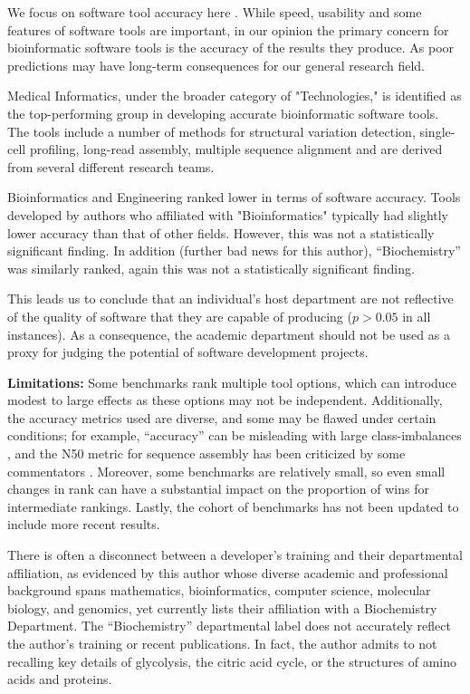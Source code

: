 \documentclass[fleqn,10pt,doc,onecolumn]{SelfArx}%
\begin{document}
We focus on software tool accuracy here \cite{weber2019essential}. While speed, usability and
some features of software tools are important, in our opinion the
primary concern for bioinformatic software tools is the accuracy of
the results they produce. As poor predictions may have long-term consequences for
our general research field. 

Medical Informatics, under the broader category of "Technologies," is
identified as the top-performing group in developing accurate
bioinformatic software tools. The tools include a number of methods
for structural variation detection, single-cell profiling, long-read
assembly, multiple sequence alignment and are derived from several
different research teams. 

Bioinformatics and Engineering ranked lower in terms of software
accuracy. Tools developed by authors who affiliated with
"Bioinformatics" typically had slightly lower accuracy than that of
other fields. However, this was not a statistically significant
finding. In addition (further bad news for this author),
``Biochemistry'' was similarly ranked, again this was not a
statistically significant finding.

This leads us to conclude that an individual's host department are not
reflective of the quality of software that they are capable of
producing ($p>0.05$ in all instances). As a consequence, the academic
department should not be used as a proxy for judging the potential of
software development projects.

\textbf{Limitations:} Some benchmarks rank multiple tool options,
which can introduce modest to large effects as these options may not
be independent. Additionally, the accuracy metrics used are diverse,
and some may be flawed under certain conditions; for example,
``accuracy'' can be misleading with large class-imbalances
\cite{luque2019impact}, and the N50 metric for sequence assembly has
been criticized by some commentators \cite{xie2021pdr}. Moreover, some
benchmarks are relatively small, so even small changes in rank can
have a substantial impact on the proportion of wins for intermediate
rankings. Lastly, the cohort of benchmarks has not been updated to
include more recent results.

There is often a disconnect between a developer’s training and their
departmental affiliation, as evidenced by this author whose diverse
academic and professional background spans mathematics,
bioinformatics, computer science, molecular biology, and genomics, yet
currently lists their affiliation with a Biochemistry Department. The
``Biochemistry'' departmental label does not accurately reflect the
author's training or recent publications. In fact, the author admits
to not recalling key details of glycolysis, the citric acid cycle, or
the structures of amino acids and proteins.
\end{document}
